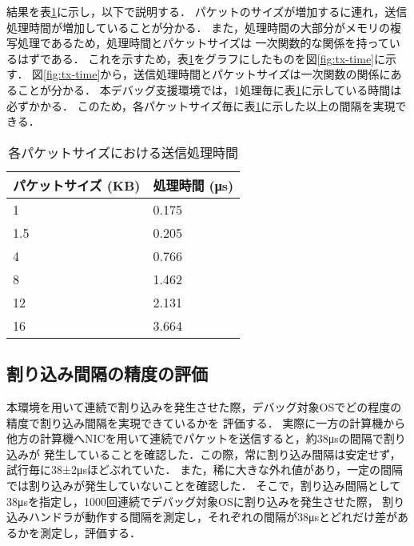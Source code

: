 \documentclass[submit,techreq,noauthor,dvipdfmx]{ipsj}
\begin{document}
結果を表\ref{tx-time}に示し，以下で説明する．
パケットのサイズが増加するに連れ，送信処理時間が増加していることが分かる．
また，処理時間の大部分がメモリの複写処理であるため，処理時間とパケットサイズは
一次関数的な関係を持っているはずである．
これを示すため，表\ref{tx-time}をグラフにしたものを図\ref{fig:tx-time}に示す．
図\ref{fig:tx-time}から，送信処理時間とパケットサイズは一次関数の関係にあることが分かる．
本デバッグ支援環境では，1処理毎に表\ref{tx-time}に示している時間は必ずかかる．
このため，各パケットサイズ毎に表\ref{tx-time}に示した以上の間隔を実現できる．


\begin{table}[h]
    \caption{各パケットサイズにおける送信処理時間}
    \label{tx-time}
    \begin{center}
        \begin{tabular}{l|l}   \hline \hline 
            パケットサイズ (KB)      & 処理時間 (μs)    \\ \hline
            1                        & 0.175            \\
            1.5                      & 0.205            \\
            4                        & 0.766            \\
            8                        & 1.462            \\
            12                       & 2.131            \\
            16                       & 3.664            \\ \hline
        \end{tabular}
    \end{center}
\end{table}

\subsection{割り込み間隔の精度の評価}\label{sec:interval}


本環境を用いて連続で割り込みを発生させた際，デバッグ対象OSでどの程度の精度で割り込み間隔を実現できているかを
評価する．
実際に一方の計算機から他方の計算機へNICを用いて連続でパケットを送信すると，約38μsの間隔で割り込みが
発生していることを確認した．この際，常に割り込み間隔は安定せず，試行毎に38±2μsほどぶれていた．
また，稀に大きな外れ値があり，一定の間隔では割り込みが発生していないことを確認した．
そこで，割り込み間隔として38μsを指定し，1000回連続でデバッグ対象OSに割り込みを発生させた際，
割り込みハンドラが動作する間隔を測定し，それぞれの間隔が38μsとどれだけ差があるかを測定し，評価する．
\end{document}
